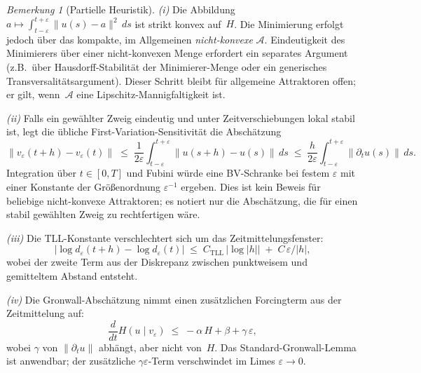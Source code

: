 \documentclass[12pt,a4paper]{article}
\theoremstyle{definition}
\theoremstyle{plain}
\theoremstyle{remark}
\newtheorem{remark}[definition]{Bemerkung}
\begin{document}
\begin{remark}[Partielle Heuristik]
\emph{(i)}\; Die Abbildung
$a \mapsto \int_{t-\varepsilon}^{t+\varepsilon} \|u(s)-a\|^2\,ds$
ist strikt konvex auf~$H$. Die Minimierung erfolgt jedoch über das
kompakte, im Allgemeinen \emph{nicht-konvexe} $\mathcal{A}$.
Eindeutigkeit des Minimierers über einer nicht-konvexen Menge erfordert
ein separates Argument (z.B.\ über Hausdorff-Stabilität der
Minimierer-Menge oder ein generisches Transversalitätsargument).
Dieser Schritt bleibt für allgemeine Attraktoren offen; er gilt,
wenn~$\mathcal{A}$ eine Lipschitz-Mannigfaltigkeit ist.

\emph{(ii)}\; Falls ein gewählter Zweig eindeutig und unter
Zeitverschiebungen lokal stabil ist, legt die übliche
First-Variation-Sensitivität die Abschätzung
\[
  \|v_\varepsilon(t+h) - v_\varepsilon(t)\|
  \;\le\;
  \frac{1}{2\varepsilon}
  \int_{t-\varepsilon}^{t+\varepsilon}
  \|u(s+h) - u(s)\|\,ds
  \;\le\;
  \frac{h}{2\varepsilon}
  \int_{t-\varepsilon}^{t+\varepsilon}
  \|\partial_t u(s)\|\,ds.
\]
Integration über $t \in [0,T]$ und Fubini würde eine
BV-Schranke bei festem \(\varepsilon\) mit einer Konstante der
Größenordnung $\varepsilon^{-1}$ ergeben. Dies ist kein Beweis für
beliebige nicht-konvexe Attraktoren; es notiert nur die Abschätzung,
die für einen stabil gewählten Zweig zu rechtfertigen wäre.

\emph{(iii)}\; Die TLL-Konstante verschlechtert sich um das
Zeitmittelungsfenster:
\[
  |\log d_\varepsilon(t+h) - \log d_\varepsilon(t)|
  \;\le\;
  C_{\mathrm{TLL}}\,|\log|h||
  \;+\;
  C\,\varepsilon/|h|,
\]
wobei der zweite Term aus der Diskrepanz zwischen punktweisem und
gemitteltem Abstand entsteht.

\emph{(iv)}\; Die Gronwall-Abschätzung nimmt einen zusätzlichen
Forcingterm aus der Zeitmittelung auf:
\[
  \frac{d}{dt} H(u \mid v_\varepsilon)
  \;\le\;
  -\alpha\,H + \beta + \gamma\,\varepsilon,
\]
wobei $\gamma$ von $\|\partial_t u\|$ abhängt, aber nicht von~$H$.
Das Standard-Gronwall-Lemma ist anwendbar; der zusätzliche
$\gamma\varepsilon$-Term verschwindet im Limes
$\varepsilon \to 0$.
\end{remark}
\end{document}
